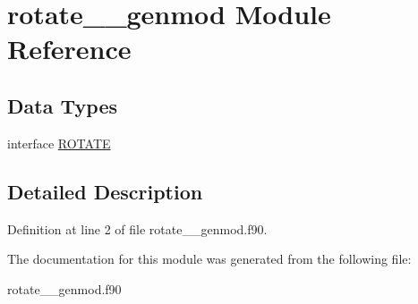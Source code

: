\hypertarget{classrotate____genmod}{\section{rotate\+\_\+\+\_\+genmod Module Reference}
\label{classrotate____genmod}
}
\subsection*{Data Types}
\begin{DoxyCompactItemize}
\item 
interface \hyperlink{interfacerotate____genmod_1_1_r_o_t_a_t_e}{R\+O\+T\+A\+T\+E}
\end{DoxyCompactItemize}


\subsection{Detailed Description}


Definition at line 2 of file rotate\+\_\+\+\_\+genmod.\+f90.



The documentation for this module was generated from the following file\+:\begin{DoxyCompactItemize}
\item 
rotate\+\_\+\+\_\+genmod.\+f90\end{DoxyCompactItemize}
